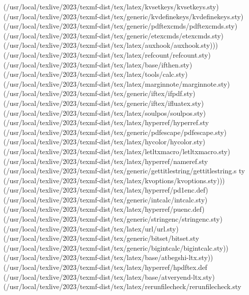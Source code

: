 (/usr/local/texlive/2023/texmf-dist/tex/latex/kvsetkeys/kvsetkeys.sty)
(/usr/local/texlive/2023/texmf-dist/tex/generic/kvdefinekeys/kvdefinekeys.sty)
(/usr/local/texlive/2023/texmf-dist/tex/generic/pdftexcmds/pdftexcmds.sty)
(/usr/local/texlive/2023/texmf-dist/tex/generic/etexcmds/etexcmds.sty)
(/usr/local/texlive/2023/texmf-dist/tex/latex/auxhook/auxhook.sty)))
(/usr/local/texlive/2023/texmf-dist/tex/latex/refcount/refcount.sty)
(/usr/local/texlive/2023/texmf-dist/tex/latex/base/ifthen.sty)
(/usr/local/texlive/2023/texmf-dist/tex/latex/tools/calc.sty)
(/usr/local/texlive/2023/texmf-dist/tex/latex/marginnote/marginnote.sty)
(/usr/local/texlive/2023/texmf-dist/tex/generic/iftex/ifpdf.sty)
(/usr/local/texlive/2023/texmf-dist/tex/generic/iftex/ifluatex.sty)
(/usr/local/texlive/2023/texmf-dist/tex/latex/soulpos/soulpos.sty)
(/usr/local/texlive/2023/texmf-dist/tex/latex/hyperref/hyperref.sty
(/usr/local/texlive/2023/texmf-dist/tex/generic/pdfescape/pdfescape.sty)
(/usr/local/texlive/2023/texmf-dist/tex/latex/hycolor/hycolor.sty)
(/usr/local/texlive/2023/texmf-dist/tex/latex/letltxmacro/letltxmacro.sty)
(/usr/local/texlive/2023/texmf-dist/tex/latex/hyperref/nameref.sty
(/usr/local/texlive/2023/texmf-dist/tex/generic/gettitlestring/gettitlestring.s
ty (/usr/local/texlive/2023/texmf-dist/tex/latex/kvoptions/kvoptions.sty)))
(/usr/local/texlive/2023/texmf-dist/tex/latex/hyperref/pd1enc.def)
(/usr/local/texlive/2023/texmf-dist/tex/generic/intcalc/intcalc.sty)
(/usr/local/texlive/2023/texmf-dist/tex/latex/hyperref/puenc.def)
(/usr/local/texlive/2023/texmf-dist/tex/generic/stringenc/stringenc.sty)
(/usr/local/texlive/2023/texmf-dist/tex/latex/url/url.sty)
(/usr/local/texlive/2023/texmf-dist/tex/generic/bitset/bitset.sty
(/usr/local/texlive/2023/texmf-dist/tex/generic/bigintcalc/bigintcalc.sty))
(/usr/local/texlive/2023/texmf-dist/tex/latex/base/atbegshi-ltx.sty))
(/usr/local/texlive/2023/texmf-dist/tex/latex/hyperref/hpdftex.def
(/usr/local/texlive/2023/texmf-dist/tex/latex/base/atveryend-ltx.sty)
(/usr/local/texlive/2023/texmf-dist/tex/latex/rerunfilecheck/rerunfilecheck.sty

